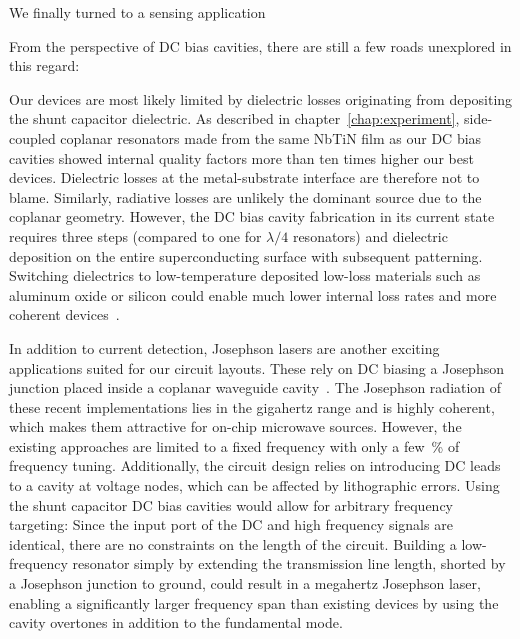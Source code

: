 We finally turned to a sensing application 


From the perspective of DC bias cavities, there are still a few roads unexplored in this regard:

Our devices are most likely limited by dielectric losses originating from depositing the shunt capacitor dielectric.
%
As described in chapter~\ref{chap:experiment}, side-coupled coplanar resonators made from the same NbTiN film as our DC bias cavities showed internal quality factors more than ten times higher our best devices.
%
Dielectric losses at the metal-substrate interface are therefore not to blame.
%
Similarly, radiative losses are unlikely the dominant source due to the coplanar geometry.
%
However, the DC bias cavity fabrication in its current state requires three steps (compared to one for $\lambda/4$ resonators) and dielectric deposition on the entire superconducting surface with subsequent patterning.
%
Switching dielectrics to low-temperature deposited low-loss materials such as aluminum oxide or silicon could enable much lower internal loss rates and more coherent devices~\cite{adamyanTunableSuperconductingMicrostrip2016}.

In addition to current detection, Josephson lasers are another exciting applications suited for our circuit layouts.
%
These rely on DC biasing a Josephson junction placed inside a coplanar waveguide cavity~\cite{chenRealizationSingleCooperpairJosephson2014c,cassidyDemonstrationAcJosephson2017e}.
%
The Josephson radiation of these recent implementations lies in the gigahertz range and is highly coherent, which makes them attractive for on-chip microwave sources.
%
However, the existing approaches are limited to a fixed frequency with only a few~\si{\percent} of frequency tuning.
%
Additionally, the circuit design relies on introducing DC leads to a cavity at voltage nodes, which can be affected by lithographic errors.
%
Using the shunt capacitor DC bias cavities would allow for arbitrary frequency targeting:
%
Since the input port of the DC and high frequency signals are identical, there are no constraints on the length of the circuit.
%
Building a low-frequency resonator simply by extending the transmission line length, shorted by a Josephson junction to ground, could result in a megahertz Josephson laser, enabling a significantly larger frequency span than existing devices by using the cavity overtones in addition to the fundamental mode.


